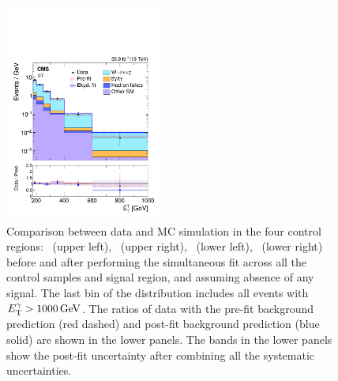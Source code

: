 \begin{figure}[htbp]
    \includegraphics[width=0.45\textwidth]{Analysis/Figures/bonly_monomu.pdf}
    \caption{
      Comparison between data and MC simulation in the four control regions: 
      \Pe\Pe\Pgg\ (upper left), 
      \Pgm\Pgm\Pgg\ (upper right), 
      \Pe\Pgg\ (lower left), 
      \Pgm\Pgg\ (lower right) 
      before and after performing the simultaneous fit across all the control samples and signal region, and assuming absence of any signal.
      The last bin of the distribution includes all events with $E_{\mathrm{T}}^{\gamma} > 1000\,\text{Ge\hspace{-.08em}V}$. 
      The ratios of data with the pre-fit background prediction (red dashed) and post-fit background prediction (blue solid) are shown in the lower panels. 
      The bands in the lower panels show the post-fit uncertainty after combining all the systematic uncertainties.
}
    \label{fig:postfitCR}
\end{figure}


